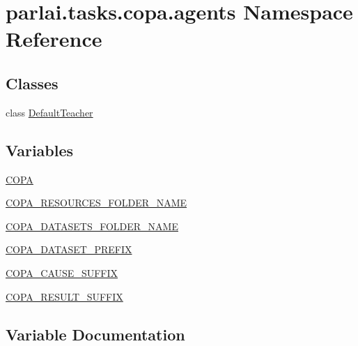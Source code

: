 \hypertarget{namespaceparlai_1_1tasks_1_1copa_1_1agents}{}\section{parlai.\+tasks.\+copa.\+agents Namespace Reference}
\label{namespaceparlai_1_1tasks_1_1copa_1_1agents}
\subsection*{Classes}
\begin{DoxyCompactItemize}
\item 
class \hyperlink{classparlai_1_1tasks_1_1copa_1_1agents_1_1DefaultTeacher}{Default\+Teacher}
\end{DoxyCompactItemize}
\subsection*{Variables}
\begin{DoxyCompactItemize}
\item 
\hyperlink{namespaceparlai_1_1tasks_1_1copa_1_1agents_a83be5dd63481c1b181d5ab008818b633}{C\+O\+PA}
\item 
\hyperlink{namespaceparlai_1_1tasks_1_1copa_1_1agents_af01500ebd318255f86c2fdcd76b798c9}{C\+O\+P\+A\+\_\+\+R\+E\+S\+O\+U\+R\+C\+E\+S\+\_\+\+F\+O\+L\+D\+E\+R\+\_\+\+N\+A\+ME}
\item 
\hyperlink{namespaceparlai_1_1tasks_1_1copa_1_1agents_adf55dbe2120c4c46c659cb08a01f7b7f}{C\+O\+P\+A\+\_\+\+D\+A\+T\+A\+S\+E\+T\+S\+\_\+\+F\+O\+L\+D\+E\+R\+\_\+\+N\+A\+ME}
\item 
\hyperlink{namespaceparlai_1_1tasks_1_1copa_1_1agents_a5b3a4f549e04fa75268f0d0af6f75e86}{C\+O\+P\+A\+\_\+\+D\+A\+T\+A\+S\+E\+T\+\_\+\+P\+R\+E\+F\+IX}
\item 
\hyperlink{namespaceparlai_1_1tasks_1_1copa_1_1agents_a36ef24111aa370fe5da05df72e523c1c}{C\+O\+P\+A\+\_\+\+C\+A\+U\+S\+E\+\_\+\+S\+U\+F\+F\+IX}
\item 
\hyperlink{namespaceparlai_1_1tasks_1_1copa_1_1agents_a6c9cd6d86eae3eceeee269bdd844f6a3}{C\+O\+P\+A\+\_\+\+R\+E\+S\+U\+L\+T\+\_\+\+S\+U\+F\+F\+IX}
\end{DoxyCompactItemize}


\subsection{Variable Documentation}
\mbox{\label{namespaceparlai_1_1tasks_1_1copa_1_1agents_a83be5dd63481c1b181d5ab008818b633}} 
